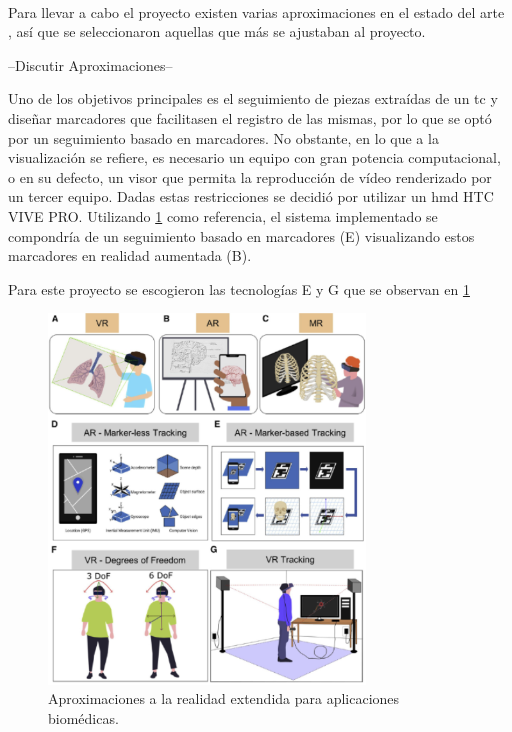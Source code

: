 \paragraph{}

Para llevar a cabo el proyecto existen varias aproximaciones en el estado del arte \cite{Venkatesan2021}, así que se seleccionaron aquellas que más se ajustaban al proyecto.

--Discutir Aproximaciones--

Uno de los objetivos principales es el seguimiento de piezas extraídas de un \acrshort{tc} y diseñar marcadores que facilitasen el registro de las mismas, por lo que se optó por un seguimiento basado en marcadores. No obstante, en lo que a la visualización se refiere, es necesario un equipo con gran potencia computacional, o en su defecto, un visor que permita la reproducción de vídeo renderizado por un tercer equipo. Dadas estas restricciones se decidió por utilizar un \acrfull{hmd} HTC VIVE PRO. Utilizando \ref{fig:vrAproximations} como referencia, el sistema implementado se compondría de un seguimiento basado en marcadores (E) visualizando estos marcadores en realidad aumentada (B).


Para este proyecto se escogieron las tecnologías E y G que se observan en \ref{fig:vrAproximations}

\begin{figure}[hp!]
  \centering
  \includegraphics[width=0.75\textwidth]{imaxes/aproxVR.png}
  \caption{Aproximaciones a la realidad extendida para aplicaciones biomédicas.}
  \label{fig:vrAproximations}
\end{figure}


